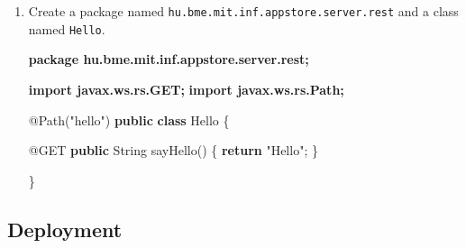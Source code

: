 \documentclass[]{report}
\newenvironment{Shaded}{}{}
\newcommand{\KeywordTok}[1]{\textcolor[rgb]{0.00,0.44,0.13}{\textbf{{#1}}}}
\newcommand{\StringTok}[1]{\textcolor[rgb]{0.25,0.44,0.63}{{#1}}}
\newcommand{\FunctionTok}[1]{\textcolor[rgb]{0.02,0.16,0.49}{{#1}}}
\newcommand{\NormalTok}[1]{{#1}}
\begin{document}
\begin{enumerate}
\def\labelenumi{\arabic{enumi}.}
\item
  Create a package named \texttt{hu.bme.mit.inf.appstore.server.rest}
  and a class named \texttt{Hello}.

\begin{Shaded}
\begin{Highlighting}[]
\KeywordTok{package hu.bme.mit.inf.appstore.server.rest;}

\KeywordTok{import javax.ws.rs.GET;}
\KeywordTok{import javax.ws.rs.Path;}

\FunctionTok{@Path}\NormalTok{(}\StringTok{"hello"}\NormalTok{)}
\KeywordTok{public} \KeywordTok{class} \NormalTok{Hello \{}

  \FunctionTok{@GET}
  \KeywordTok{public} \NormalTok{String }\FunctionTok{sayHello}\NormalTok{() \{}
    \KeywordTok{return} \StringTok{"Hello"}\NormalTok{;}
  \NormalTok{\}}

\NormalTok{\}}
\end{Highlighting}
\end{Shaded}
\end{enumerate}

\subsection{Deployment}
\end{document}
